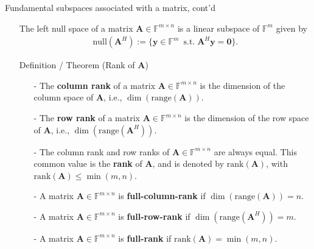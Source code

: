 \documentclass[t,usepdftitle=false]{beamer}
\begin{document}
\begin{frame}{Fundamental subspaces associated with a matrix, cont'd}
\begin{itemize}
\item[] 
\begin{definition}
The left null space of a matrix $\mathbf{A}\in\mathbb{F}^{m\times n}$ is a linear subspace of $\mathbb{F}^m$ given by\vspace{-.25cm}
\begin{align*}
\mathrm{null}(\mathbf{A}^H):=\{\mathbf{y}\in\mathbb{F}^m\,\text{ s.t.}\;\mathbf{A}^H\mathbf{y}=\boldsymbol{0}\}.
\end{align*}
\end{definition}
\vspace{-.1cm}
\begin{block}{Definition / Theorem (Rank of $\mathbf{A}$)}
\begin{itemize}
\item[-] The \textbf{column rank} of a matrix $\mathbf{A}\in\mathbb{F}^{m\times n}$ is the dimension of the column space of $\mathbf{A}$, i.e., $\dim(\mathrm{range}(\mathbf{A}))$.\vspace{-.15cm}
\item[-] The \textbf{row rank} of a matrix $\mathbf{A}\in\mathbb{F}^{m\times n}$ is the dimension of the row space of $\mathbf{A}$, i.e., $\dim(\mathrm{range}(\mathbf{A}^H))$.\vspace{-.15cm}
\item[-] The column rank and row ranks of $\mathbf{A}\in\mathbb{F}^{m\times n}$ are always equal.
This common value is the \textbf{rank} of $\mathbf{A}$, and is denoted by $\mathrm{rank}(\mathbf{A})$, with $\mathrm{rank}(\mathbf{A})\leq\min(m,n)$.
\end{itemize}
\end{block}
\vspace{-.1cm}
\begin{definition}
\begin{itemize}
\item[-] A matrix $\mathbf{A}\in\mathbb{F}^{m\times n}$ is \textbf{full-column-rank} if $\dim(\mathrm{range}(\mathbf{A}))=n$.\vspace{-.15cm}
\item[-] A matrix $\mathbf{A}\in\mathbb{F}^{m\times n}$ is \textbf{full-row-rank} if $\dim(\mathrm{range}(\mathbf{A}^H))=m$.\vspace{-.15cm}
\item[-] A matrix $\mathbf{A}\in\mathbb{F}^{m\times n}$ is \textbf{full-rank} if $\mathrm{rank}(\mathbf{A})=\min(m,n)$.
\end{itemize}
\end{definition}
\end{itemize}
\end{frame}
\end{document}
